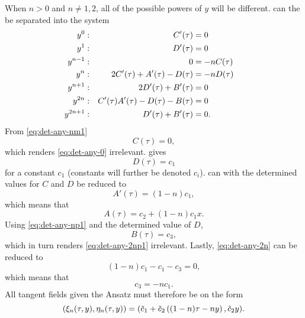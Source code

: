 When \(n>0\) and \(n\neq1,2\), all of the possible powers of \(y\) will be different.
 can the be separated into the system
\begin{subequations}
  \begin{flalign}
    y^0:      && C'(\tau) &= 0                               &&\FlLabel{eq:det-any-0}\\
    y^1:      && D'(\tau) &= 0                               &&\FlLabel{eq:det-any-1} \\
    y^{n-1}:  && 0 &= -nC(\tau)                              &&\FlLabel{eq:det-any-nm1} \\
    y^n:      && 2C'(\tau) + A'(\tau) - D(\tau) &= -nD(\tau) &&\FlLabel{eq:det-any-n} \\
    y^{n+1}:  && 2D'(\tau) + B'(\tau) &= 0                   &&\FlLabel{eq:det-any-np1} \\
    y^{2n}:   && C'(\tau) A'(\tau) - D(\tau) - B(\tau) &= 0  &&\FlLabel{eq:det-any-2n} \\
    y^{2n+1}: && D'(\tau) + B'(\tau) &= 0.                   &&\FlLabel{eq:det-any-2np1}
  \end{flalign}
\end{subequations}
From \cref{eq:det-any-nm1}
\begin{equation}
  C(\tau) = 0,
\end{equation}
which renders \cref{eq:det-any-0} irrelevant.
 gives
\begin{equation}
  D(\tau) = c_1
\end{equation}
for a constant \(c_1\) (constants will further be denoted \(c_i\)).
 can with the determined values for \(C\) and \(D\) be reduced to
\begin{equation}
  A'(\tau) = (1-n) c_1,
\end{equation}
which means that
\begin{equation}
  A(\tau) = c_2 + (1-n) c_1 x.
\end{equation}
Using \cref{eq:det-any-np1} and the determined value of \(D\),
\begin{equation}
  B(\tau) = c_3,
\end{equation}
which in turn renders \cref{eq:det-any-2np1} irrelevant.
Lastly, \cref{eq:det-any-2n} can be reduced to
\begin{equation}
  (1-n) c_1 - c_1 - c_3 = 0,
\end{equation}
which means that
\begin{equation}
  c_3 = -n c_1.
\end{equation}
All tangent fields given the Ansatz must therefore be on the form
\begin{equation} \label{eq:hill-tangent-field-any}
  \pqty{\xi_n(\tau,y),\eta_n(\tau,y)} = 
  \pqty{\tilde{c}_1 + \tilde{c}_2 \left( (1-n) \tau - n y \right), \tilde{c}_2 y}.
\end{equation}

